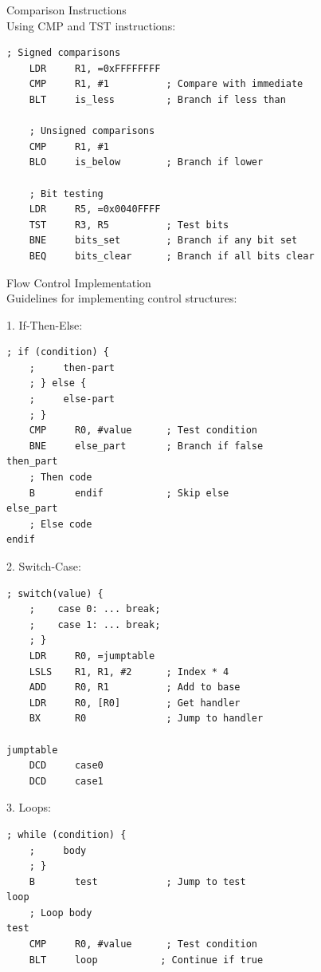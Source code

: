 \begin{example2}{Comparison Instructions}\\
Using CMP and TST instructions:
\begin{lstlisting}[language=armasm, style=basesmol]
    ; Signed comparisons
    LDR     R1, =0xFFFFFFFF
    CMP     R1, #1          ; Compare with immediate
    BLT     is_less         ; Branch if less than
    
    ; Unsigned comparisons
    CMP     R1, #1
    BLO     is_below        ; Branch if lower
    
    ; Bit testing
    LDR     R5, =0x0040FFFF
    TST     R3, R5          ; Test bits
    BNE     bits_set        ; Branch if any bit set
    BEQ     bits_clear      ; Branch if all bits clear
\end{lstlisting}
\end{example2}

\begin{KR}{Flow Control Implementation}\\
Guidelines for implementing control structures:

1. If-Then-Else:
\begin{lstlisting}[language=armasm, style=basesmol]
    ; if (condition) {
    ;     then-part
    ; } else {
    ;     else-part
    ; }
    CMP     R0, #value      ; Test condition
    BNE     else_part       ; Branch if false
then_part
    ; Then code
    B       endif           ; Skip else
else_part
    ; Else code
endif
\end{lstlisting}

2. Switch-Case:
\begin{lstlisting}[language=armasm, style=basesmol]
    ; switch(value) {
    ;    case 0: ... break;
    ;    case 1: ... break;
    ; }
    LDR     R0, =jumptable
    LSLS    R1, R1, #2      ; Index * 4
    ADD     R0, R1          ; Add to base
    LDR     R0, [R0]        ; Get handler
    BX      R0              ; Jump to handler

jumptable
    DCD     case0
    DCD     case1
\end{lstlisting}

3. Loops:
\begin{lstlisting}[language=armasm, style=basesmol]
    ; while (condition) {
    ;     body
    ; }
    B       test            ; Jump to test
loop
    ; Loop body
test
    CMP     R0, #value      ; Test condition
    BLT     loop           ; Continue if true
\end{lstlisting}
\end{KR}

